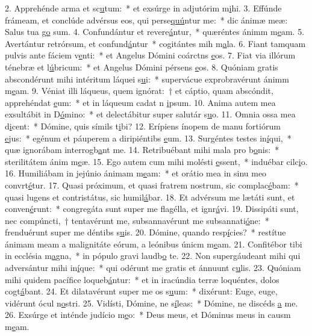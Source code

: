 2. Apprehénde arma et sc\uline{u}tum:~* et exsúrge in adjutórim m\uline{i}hi.
3. Effúnde frámeam, et conclúde advérsus eos, qui perse\uline{quú}ntur me:~* dic ánimæ meæ: Salus tua g\uline{o} sum.
4. Confundántur et revere\uline{á}ntur,~* quæréntes ánimm m\uline{e}am.
5. Avertántur retrórsum, et confund\uline{á}ntur~* cogitántes mih m\uline{a}la.
6. Fiant tamquam pulvis ante fáciem v\uline{e}nti:~* et Angelus Dómini coárctns \uline{e}os.
7. Fiat via illórum ténebræ et l\uline{ú}bricum:~* et Angelus Dómini pérsens \uline{e}os.
8. Quóniam gratis abscondérunt mihi intéritum láquei s\uline{u}i:~* supervácue exprobravérunt ánimm m\uline{e}am.
9. Véniat illi láqueus, quem ignórat:~† et cáptio, quam abscóndit, apprehéndat \uline{e}um:~* et in láqueum cadat n \uline{i}psum.
10. Anima autem mea exsultábit in D\uline{ó}mino:~* et delectábitur super salutár s\uline{u}o.
11. Omnia ossa mea d\uline{i}cent:~* Dómine, quis símils t\uline{i}bi?
12. Erípiens ínopem de manu fortiórum \uline{e}jus:~* egénum et páuperem a diripiéntibs \uline{e}um.
13. Surgéntes testes in\uline{í}qui,~* quæ ignorábam interrogb\uline{a}nt me.
14. Retribuébant mihi mala pro b\uline{o}nis:~* sterilitátem ánim m\uline{e}æ.
15. Ego autem cum mihi molésti \uline{e}ssent,~* induébar cilc\uline{i}o.
16. Humiliábam in jejúnio ánimam m\uline{e}am:~* et orátio mea in sinu meo convrt\uline{é}tur.
17. Quasi próximum, et quasi fratrem nostrum, sic complac\uline{é}bam:~* quasi lugens et contristátus, sic humil\uline{á}bar.
18. Et advérsum me lætáti sunt, et conven\uline{é}runt:~* congregáta sunt super me flagélla, et ignr\uline{á}vi.
19. Dissipáti sunt, nec compúncti,~† tentavérunt me, subsannavérunt me subsannati\uline{ó}ne:~* frenduérunt super me déntibs s\uline{u}is.
20. Dómine, quando resp\uline{í}cies?~* restítue ánimam meam a malignitáte eórum, a leónibus únicm m\uline{e}am.
21. Confitébor tibi in ecclésia m\uline{a}gna,~* in pópulo gravi laudb\uline{o} te.
22. Non supergáudeant mihi qui adversántur mihi in\uline{í}que:~* qui odérunt me gratis et ánnuunt c\uline{u}lis.
23. Quóniam mihi quidem pacífice loqueb\uline{á}ntur:~* et in iracúndia terræ loquéntes, dolos cogt\uline{á}bant.
24. Et dilatavérunt super me os s\uline{u}um:~* dixérunt: Euge, euge, vidérunt ócul n\uline{o}stri.
25. Vidísti, Dómine, ne s\uline{í}leas:~* Dómine, ne discéds \uline{a} me.
26. Exsúrge et inténde judício m\uline{e}o:~* Deus meus, et Dóminus meus in causm m\uline{e}am.
